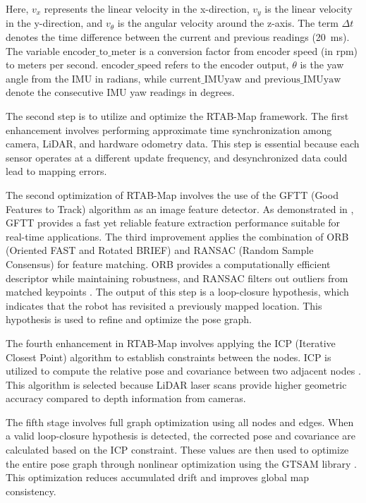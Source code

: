 \documentclass[conference, a4paper]{IEEEtran}
\begin{document}
Here, $v_x$ represents the linear velocity in the x-direction, $v_y$ is the linear velocity in the y-direction, and $v_\theta$ is the angular velocity around the z-axis. The term $\Delta t$ denotes the time difference between the current and previous readings (20~ms). The variable $\text{encoder\_to\_meter}$ is a conversion factor from encoder speed (in rpm) to meters per second. $\text{encoder\_speed}$ refers to the encoder output, $\theta$ is the yaw angle from the IMU in radians, while $\text{current\_IMUyaw}$ and $\text{previous\_IMUyaw}$ denote the consecutive IMU yaw readings in degrees.

\par
The second step is to utilize and optimize the RTAB-Map framework. The first enhancement involves performing approximate time synchronization among camera, LiDAR, and hardware odometry data. This step is essential because each sensor operates at a different update frequency, and desynchronized data could lead to mapping errors.

\par
The second optimization of RTAB-Map involves the use of the GFTT (Good Features to Track) algorithm as an image feature detector. As demonstrated in \cite{ref_image_matching}, GFTT provides a fast yet reliable feature extraction performance suitable for real-time applications. The third improvement applies the combination of ORB (Oriented FAST and Rotated BRIEF) and RANSAC (Random Sample Consensus) for feature matching. ORB provides a computationally efficient descriptor while maintaining robustness, and RANSAC filters out outliers from matched keypoints \cite{ref_orb_ransac}. The output of this step is a loop-closure hypothesis, which indicates that the robot has revisited a previously mapped location. This hypothesis is used to refine and optimize the pose graph.

\par
The fourth enhancement in RTAB-Map involves applying the ICP (Iterative Closest Point) algorithm to establish constraints between the nodes. ICP is utilized to compute the relative pose and covariance between two adjacent nodes \cite{ref_icp}. This algorithm is selected because LiDAR laser scans provide higher geometric accuracy compared to depth information from cameras.

\par
The fifth stage involves full graph optimization using all nodes and edges. When a valid loop-closure hypothesis is detected, the corrected pose and covariance are calculated based on the ICP constraint. These values are then used to optimize the entire pose graph through nonlinear optimization using the GTSAM library \cite{ref_gtsam}. This optimization reduces accumulated drift and improves global map consistency.
\end{document}
